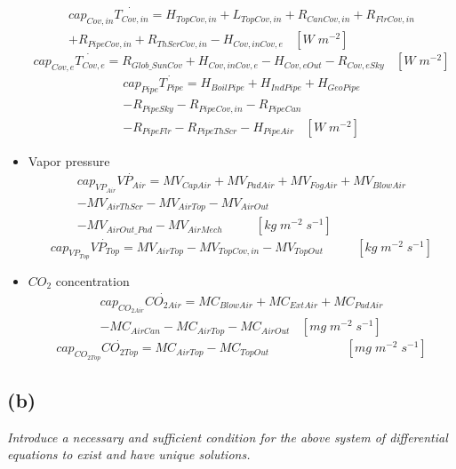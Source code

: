 \documentclass[a4paper]{article}
\begin{document}
\begin{itemize}
\begin{equation}
        \end{equation}
        \begin{multline}
          cap_{Cov,in}\dot{T_{Cov,in}} = H_{TopCov,in} + L_{TopCov,in} + R_{CanCov,in} + R_{FlrCov,in} \\
          + R_{PipeCov,in} + R_{ThScrCov,in} - H_{Cov,inCov,e} ~~~~ [W\;m^{-2}]
        \end{multline}
        \begin{equation}
          cap_{Cov,e}\dot{T_{Cov,e}} = R_{Glob\_SunCov} + H_{Cov,inCov,e} - H_{Cov,eOut} - R_{Cov,eSky} ~~~~ [W\;m^{-2}]
        \end{equation}
        \begin{multline}
          cap_{Pipe}\dot{T_{Pipe}} = H_{BoilPipe} + H_{IndPipe} + H_{GeoPipe} \\
          - R_{PipeSky} - R_{PipeCov,in} - R_{PipeCan} \\
          - R_{PipeFlr} - R_{PipeThScr} - H_{PipeAir} ~~~~ [W\;m^{-2}]
        \end{multline}
  \item Vapor pressure
        \begin{multline}
          cap_{VP_{Air}}\dot{VP_{Air}} = MV_{CapAir} + MV_{PadAir} + MV_{FogAir} + MV_{BlowAir} \\
          - MV_{AirThScr} - MV_{AirTop} - MV_{AirOut} \\
          - MV_{AirOut\_Pad} - MV_{AirMech} ~~~~~~~~~~~~ [kg\;m^{-2}\;s^{-1}]
        \end{multline}
        \begin{equation}
          cap_{VP_{Top}}\dot{VP_{Top}} = MV_{AirTop} - MV_{TopCov,in} - MV_{TopOut} ~~~~~~~~~~~~ [kg\;m^{-2}\;s^{-1}]
        \end{equation}
  \item \(CO_2\) concentration
        \begin{multline}
          cap_{CO_{2Air}}\dot{CO_{2Air}} = MC_{BlowAir} + MC_{ExtAir} + MC_{PadAir} \\
          - MC_{AirCan} - MC_{AirTop} - MC_{AirOut} ~~~~ [mg\;m^{-2}\;s^{-1}]
        \end{multline}
        \begin{equation}
          cap_{CO_{2Top}}\dot{CO_{2Top}} = MC_{AirTop} - MC_{TopOut} ~~~~~~~~~~~~~~~~~~~~~~~~~~~~ [mg\;m^{-2}\;s^{-1}]
        \end{equation}
\end{itemize}

\subsection{(b)}
\textit{Introduce a necessary and sufficient condition for the above system of differential equations to exist and have unique solutions.}
\end{document}
